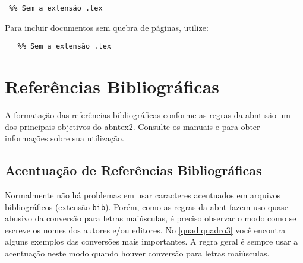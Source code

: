 \begin{SingleSpacing}%
\begin{verbatim}
 %% Sem a extensão .tex
\end{verbatim}
\end{SingleSpacing}

Para incluir documentos sem quebra de páginas, utilize:

\begin{SingleSpacing}%
\begin{verbatim}
   %% Sem a extensão .tex
\end{verbatim}
\end{SingleSpacing}

\section{Referências Bibliográficas}\label{sec:referencias}

A formatação das referências bibliográficas conforme as regras da \gls{abnt} são um dos principais objetivos do \gls{abntex2}. Consulte os manuais  e  para obter informações sobre sua utilização.

\subsection{Acentuação de Referências Bibliográficas}\label{sec:acentuacaodereferencias}

Normalmente não há problemas em usar caracteres acentuados em arquivos bibliográficos (extensão \texttt{bib}). Porém, como as regras da \gls{abnt} fazem uso quase abusivo da conversão para letras maiúsculas, é preciso observar o modo como se escreve os nomes dos autores e/ou editores. No \autoref{quad:quadro3} você encontra alguns exemplos das conversões mais importantes. A regra geral é sempre usar a acentuação neste modo quando houver conversão para letras maiúsculas.

